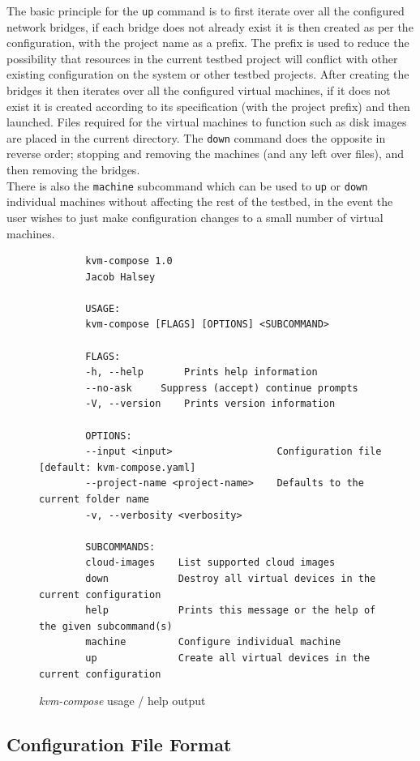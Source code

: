 \documentclass[
    author={Jacob Daniel Halsey},
    supervisor={Prof. Awais Rashid},
    degree={BSc},
    title={Building a Testbed for Evaluating Privacy Enhancing Technologies  (PETs)},
    subtitle={},
    type={software development},
    year={2021}
]{dissertation}
\begin{document}
The basic principle for the \texttt{up} command is to first iterate over all the configured network bridges,
if each bridge does not already exist it is then created as per the configuration, with the project name as a prefix.
The prefix is used to reduce the possibility that resources in the current testbed project will conflict
with other existing configuration on the system or other testbed projects. 
After creating the bridges it then iterates over all the configured virtual machines, if it does not exist
it is created according to its specification (with the project prefix) and then launched. 
Files required for the virtual machines to function such as disk images are placed in the current directory.
The \texttt{down} command does the opposite in reverse order;
stopping and removing the machines (and any left over files), and then removing the bridges. \\

There is also the \texttt{machine} subcommand which can be used to \texttt{up} or \texttt{down} individual machines
without affecting the rest of the testbed, in the event the user wishes to just make configuration changes
to a small number of virtual machines.

\begin{figure}
	\begin{verbatim}
		kvm-compose 1.0
		Jacob Halsey
		
		USAGE:
		kvm-compose [FLAGS] [OPTIONS] <SUBCOMMAND>
		
		FLAGS:
		-h, --help       Prints help information
		--no-ask     Suppress (accept) continue prompts
		-V, --version    Prints version information
		
		OPTIONS:
		--input <input>                  Configuration file [default: kvm-compose.yaml]
		--project-name <project-name>    Defaults to the current folder name
		-v, --verbosity <verbosity>          
		
		SUBCOMMANDS:
		cloud-images    List supported cloud images
		down            Destroy all virtual devices in the current configuration
		help            Prints this message or the help of the given subcommand(s)
		machine         Configure individual machine
		up              Create all virtual devices in the current configuration
	\end{verbatim}
	\caption{\emph{kvm-compose} usage / help output}
	\label{fig:kvm_compose_usage}
\end{figure}

\subsection{Configuration File Format}
\end{document}
